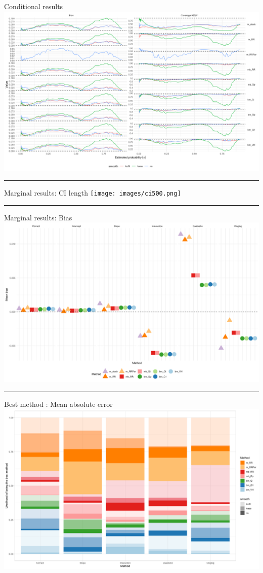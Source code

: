 \documentclass[
  letterpaper,
  DIV=11,
  numbers=noendperiod]{scrartcl}
\begin{document}
{ Conditional results} \includegraphics{images/Cond.png}

\begin{center}\rule{0.5\linewidth}{0.5pt}\end{center}

{ Marginal results: CI length} \texttt{[image: images/ci500.png]}

\begin{center}\rule{0.5\linewidth}{0.5pt}\end{center}

{ Marginal results: Bias} \includegraphics{images/meanbias.png}

\begin{center}\rule{0.5\linewidth}{0.5pt}\end{center}

{ Best method : Mean absolute error}
\includegraphics{images/probici.png}
\end{document}
